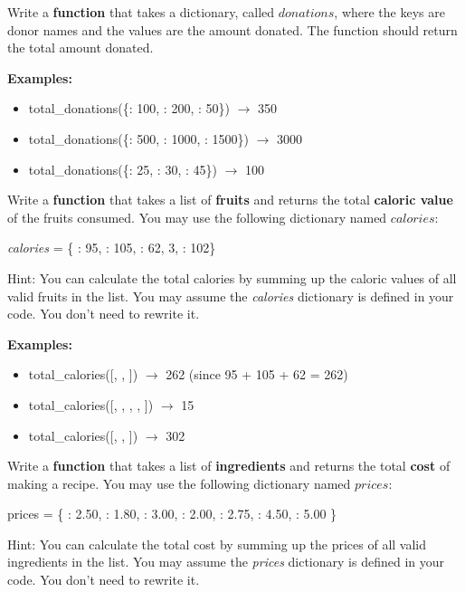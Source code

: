 \item
	Write a \textbf{function} that takes a dictionary, called $donations$, where the keys are donor names and the values are the amount donated. 
	The function should return the total amount donated.
	
	\textbf{Examples:}  
	\begin{itemize}  
		\item total\_donations(\{: 100, : 200, : 50\}) $\rightarrow$ 350
		\item total\_donations(\{: 500, : 1000, : 1500\}) $\rightarrow$ 3000
		\item total\_donations(\{: 25, : 30, : 45\}) $\rightarrow$ 100
	\end{itemize}




\item
	Write a \textbf{function} that takes a list of \textbf{fruits} and returns the total \textbf{caloric value} of the fruits consumed. You may use the following 
	dictionary named $calories$:
	\begin{center}
		\textit{calories} = \{  : 95,  : 105,  : 62, 
			 3,  : 102\}
	\end{center}
	Hint: You can calculate the total calories by summing up the caloric values of all valid 
	fruits in the list. You may assume the \textit{calories} dictionary is defined in your code.  
	You don't need to rewrite it.
	
	
	\textbf{Examples:}  
	\begin{itemize}  
		\item total\_calories([, , ]) 
			$\rightarrow$ 262 (since 95 + 105 + 62 = 262)
		\item total\_calories([, , , , ]) 
			$\rightarrow$ 15
		\item total\_calories([, , ]) $\rightarrow$ 302
	\end{itemize}


\item
	Write a \textbf{function} that takes a list of \textbf{ingredients} and returns the total 
	\textbf{cost} of making a recipe. You may use the following dictionary named $prices$:
	\begin{center}
		prices = \{  : 2.50,  : 1.80,  : 3.00,  : 2.00, 
			 : 2.75,  : 4.50,  : 5.00 \}
	\end{center}
	Hint: You can calculate the total cost by summing up the prices of all valid ingredients in 
	the list.  You may assume the \textit{prices} dictionary is defined in your code.  You don't 
	need to rewrite it.
	
